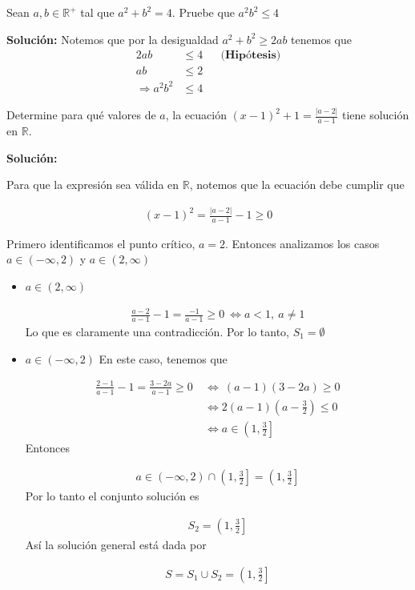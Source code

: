 \documentclass[12pt]{book}
\begin{document}
\begin{prob}{}{}
    Sean $a,b\in \mathbb{R}^+$ tal que $a^2+b^2=4$. Pruebe que $a^2b^2\leq 4$
\end{prob}
\textbf{Solución:}
Notemos que por la desigualdad $a^2+b^2\geq 2ab$ tenemos que 
\begin{align*}
    2ab &\leq 4 && \textbf{(Hipótesis)} \\
     ab &\leq 2  \\ 
     \Longrightarrow a^2b^2&\leq 4
\end{align*}


\begin{prob}{}{}
    Determine para qué valores de $a$, la ecuación $\displaystyle (x-1)^2+1=\frac{|a-2|}{a-1}$ tiene solución en $\mathbb{R}$.
\end{prob}
\textbf{Solución:}

Para que la expresión sea válida en $\mathbb{R}$, notemos que la ecuación debe cumplir que 

\begin{align*}
    (x-1)^2=\frac{|a-2|}{a-1}-1 \geq 0
\end{align*}

Primero identificamos el punto crítico, $a=2$. Entonces analizamos los casos $a \in (-\infty,2)$ y $a \in (2,\infty)$

\begin{itemize}
    \item $a \in (2,\infty)$ 

    \begin{align*}
        \frac{a-2}{a-1}-1=\frac{-1}{a-1}\geq 0 \  \Longleftrightarrow a <1, \ a\neq 1
    \end{align*}
    Lo que es claramente una contradicción. Por lo tanto, $S_1=\emptyset$

    \item $a  \in (-\infty,2)$ En este caso, tenemos que 

    \begin{align*}
        \frac{2-1}{a-1}-1=\frac{3-2a}{a-1} \geq 0  \ &\Longleftrightarrow \ (a-1)(3-2a) \geq 0 \\
        &\Longleftrightarrow 2(a-1)\left(a-\frac{3}{2}\right)  \leq 0 \\
        &\Longleftrightarrow a \in \left(1,\frac{3}{2} \right]
    \end{align*}
    Entonces 
    
   \begin{align*}
     a\in   (-\infty,2) \cap \left(1,\frac{3}{2} \right] =\left(1,\frac{3}{2} \right]
   \end{align*}
   Por lo tanto el conjunto solución es 

   \begin{align*}
       S_2=\left(1,\frac{3}{2} \right]
   \end{align*}
   Así la solución general está dada por 

   \begin{align*}
       S=S_1 \cup S_2 = \left(1,\frac{3}{2} \right]
   \end{align*}
\end{itemize}
\end{document}
